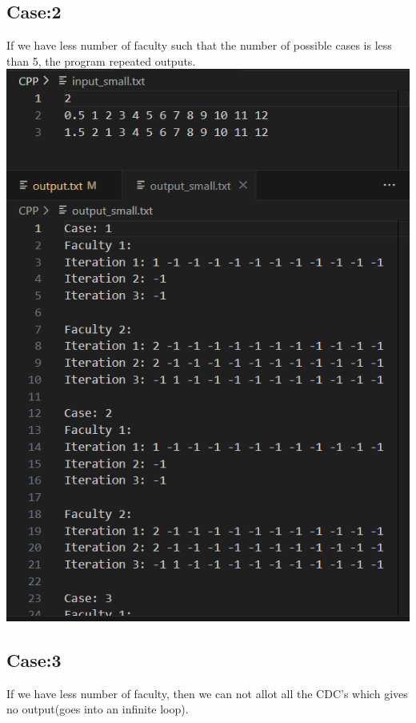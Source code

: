 \documentclass{article}
\begin{document}
\subsection{Case:2}
If we have less number of faculty such that the number of possible cases is less than 5, the program repeated outputs.\\
\includegraphics[scale=0.5]{images/crash2.png}\\
\subsection{Case:3}
If we have less number of faculty, then we can not allot all the CDC's which gives no output(goes into an infinite loop).
\end{document}
